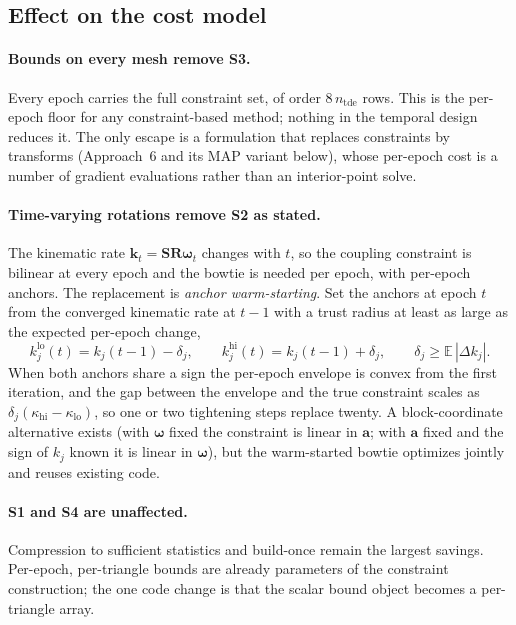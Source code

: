 \documentclass[11pt]{article}
\newcommand{\vect}[1]{\bm{#1}}
\newcommand{\mat}[1]{\mathbf{#1}}
\begin{document}
\subsection{Effect on the cost model}

\paragraph{Bounds on every mesh remove S3.}
Every epoch carries the full constraint set, of order $8\,n_{\mathrm{tde}}$ rows. This is the per-epoch floor for any constraint-based method; nothing in the temporal design reduces it. The only escape is a formulation that replaces constraints by transforms (Approach~6 and its MAP variant below), whose per-epoch cost is a number of gradient evaluations rather than an interior-point solve.

\paragraph{Time-varying rotations remove S2 as stated.}
The kinematic rate $\vect{k}_t = \mat{S}\mat{R}\vect{\omega}_t$ changes with $t$, so the coupling constraint is bilinear at every epoch and the bowtie is needed per epoch, with per-epoch anchors. The replacement is \emph{anchor warm-starting}. Set the anchors at epoch $t$ from the converged kinematic rate at $t-1$ with a trust radius at least as large as the expected per-epoch change,
\begin{equation}
k^{\mathrm{lo}}_{j}(t) = k_j(t-1) - \delta_j, \qquad k^{\mathrm{hi}}_{j}(t) = k_j(t-1) + \delta_j, \qquad \delta_j \ge \mathbb{E}\,|\Delta k_j|.
\end{equation}
When both anchors share a sign the per-epoch envelope is convex from the first iteration, and the gap between the envelope and the true constraint scales as $\delta_j(\kappa_{\mathrm{hi}} - \kappa_{\mathrm{lo}})$, so one or two tightening steps replace twenty. A block-coordinate alternative exists (with $\vect{\omega}$ fixed the constraint is linear in $\vect{a}$; with $\vect{a}$ fixed and the sign of $k_j$ known it is linear in $\vect{\omega}$), but the warm-started bowtie optimizes jointly and reuses existing code.

\paragraph{S1 and S4 are unaffected.}
Compression to sufficient statistics and build-once remain the largest savings. Per-epoch, per-triangle bounds are already parameters of the constraint construction; the one code change is that the scalar bound object becomes a per-triangle array.
\end{document}
